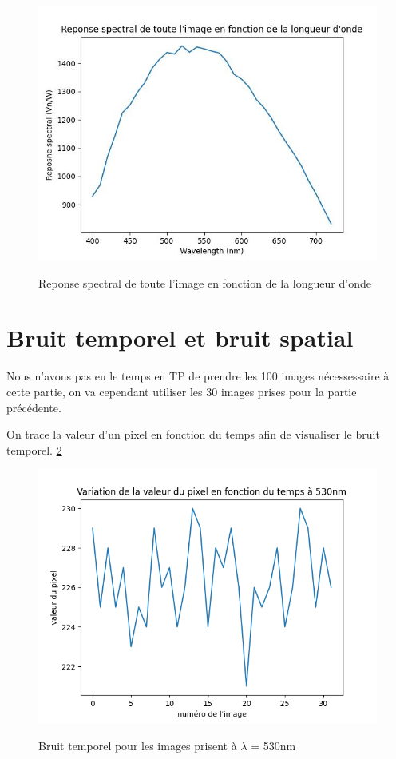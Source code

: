 \documentclass{article}
\begin{document}
\begin{figure}[H]
\centering
\includegraphics[scale=0.7]{full_img.jpg}
\label{fig:full_img}
\caption{Reponse spectral de toute l'image en fonction de la longueur d'onde}
\end{figure}

\section{Bruit temporel et bruit spatial}

Nous n'avons pas eu le temps en TP de prendre les 100 images nécessessaire à cette partie, on va cependant utiliser les 30 images prises pour la partie précédente.

On trace la valeur d'un pixel en fonction du temps afin de visualiser le bruit temporel. \ref{fig:bruit_temporel}


\begin{figure}[H]
\centering
\includegraphics[scale=0.7]{bruit_temporel.png}
\label{fig:bruit_temporel}
\caption{Bruit temporel pour les images prisent à $\lambda$ = 530nm}
\end{figure}
\end{document}
